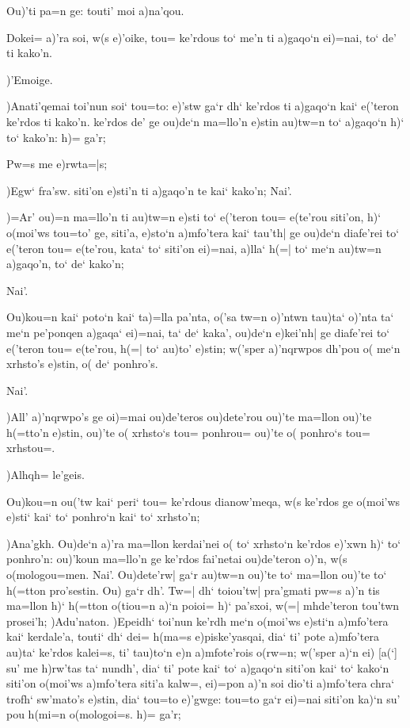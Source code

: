 \documentclass[11pt]{book}
\newcommand {\Spar} {\Npar*{=+1}\numerus{1}}
\begin{document}
\2 Ou)'ti pa=n ge: touti' moi a)na'qou.

\1 Dokei= a)'ra soi, w(s e)'oike, tou= ke'rdous to` me'n ti a)gaqo`n ei)=nai,
to` de' ti kako'n.

\2 )'Emoige.

\1 )Anati'qemai toi'nun soi` tou=to: e)'stw ga`r dh` ke'rdos ti a)gaqo`n kai`
e('teron ke'rdos ti kako'n. ke'rdos de' ge ou)de`n ma=llo'n e)stin au)tw=n to`
a)gaqo`n h)` to` kako'n: h)= ga'r;

\2 Pw=s me e)rwta=|s;

\1 )Egw` fra'sw. siti'on e)sti'n ti a)gaqo'n te kai` kako'n;
\2 \Spar Nai'.

\1 )=Ar' ou)=n ma=llo'n ti au)tw=n e)sti to` e('teron tou= e(te'rou siti'on, h)`
o(moi'ws tou=to' ge, siti'a, e)sto`n a)mfo'tera kai` tau'th| ge ou)de`n
diafe'rei to` e('teron tou= e(te'rou, kata` to` siti'on ei)=nai, a)lla` h(=|
to` me`n au)tw=n a)gaqo'n, to` de` kako'n;

\2 Nai'.

\1 Ou)kou=n kai` poto`n kai` ta)=lla pa'nta, o('sa tw=n o)'ntwn tau)ta` o)'nta
ta` me`n pe'ponqen a)gaqa` ei)=nai, ta` de` kaka', ou)de`n e)kei'nh| ge
diafe'rei to` e('teron tou= e(te'rou, h(=| to`
\Spar %
 au)to' e)stin; w('sper a)'nqrwpos dh'pou o( me`n xrhsto's e)stin, o(
de` ponhro's.

\2 Nai'.

\1 )All' a)'nqrwpo's ge oi)=mai ou)de'teros ou)dete'rou ou)'te ma=llon ou)'te
h(=tto'n e)stin, ou)'te o( xrhsto`s tou= ponhrou= ou)'te o( ponhro`s tou=
xrhstou=.

\2 )Alhqh= le'geis.

\1 Ou)kou=n ou('tw kai` peri` tou= ke'rdous dianow'meqa, w(s ke'rdos ge o(moi'ws
e)sti` kai` to` ponhro`n kai` to` xrhsto'n;

\2 )Ana'gkh.
\1 Ou)de`n a)'ra ma=llon kerdai'nei o( to` xrhsto`n ke'rdos e)'xwn h)` to`
ponhro'n: ou)'koun ma=llo'n ge ke'rdos fai'netai
\Spar %
 ou)de'teron o)'n, w(s o(mologou=men.
\2 Nai'.
\1  Ou)dete'rw| ga`r au)tw=n ou)'te to` ma=llon ou)'te to` h(=tton pro'sestin.
\2  Ou) ga`r dh'.
\1  Tw=| dh` toiou'tw| pra'gmati pw=s a)'n tis ma=llon h)` h(=tton o(tiou=n a)`n
poioi= h)` pa'sxoi, w(=| mhde'teron tou'twn prosei'h;
\2  )Adu'naton.  
\1 )Epeidh`  toi'nun ke'rdh me`n o(moi'ws e)sti`n a)mfo'tera kai` kerdale'a,
touti` dh` dei= h(ma=s e)piske'yasqai, dia` ti' pote a)mfo'tera au)ta` ke'rdos
kalei=s, ti' tau)to`n e)n a)mfote'rois o(rw=n;
\Spar %
 w('sper a)`n ei) [a(`] su' me h)rw'tas ta` nundh', dia` ti' pote kai`
to` a)gaqo`n siti'on kai` to` kako`n siti'on o(moi'ws a)mfo'tera siti'a kalw=,
ei)=pon a)'n soi dio'ti a)mfo'tera chra` trofh` sw'mato's e)stin, dia` tou=to
e)'gwge: tou=to ga`r ei)=nai siti'on ka)`n su' pou h(mi=n o(mologoi=s. h)=
ga'r;
\end{document}
